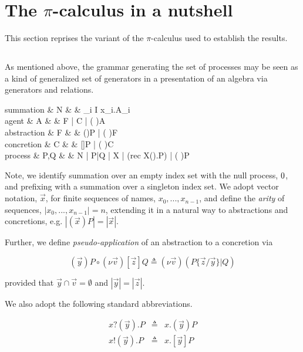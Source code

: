 \documentclass[]{llncs}
\begin{document}
\section{The $\pi$-calculus in a nutshell} \label{Pinut}

This section reprises the variant of the $\pi$-calculus used to
establish the results.

\subsection{\pic}

As mentioned above, the grammar generating the set of processes may be
seen as a kind of generalized set of generators in a presentation of
an algebra via generators and relations.

\begin{grammar}
\mbox{summation} & {N} & \bc & \Sigma_{i \in I} x_i.A_i \\
\mbox{agent} & {A} & \bc & F \;| \; C \;| \; (\nu \; )A \\
\mbox{abstraction} & {F} & \bc & ()P \;| \; (\nu \; )F \\
\mbox{concretion} & {C} & \bc & []P \;| \; (\nu \; )C \\
\mbox{process} & {P,Q} & \bc & N \;| \;P|Q \;| X\langle {} \rangle \;| \; (\textsf{rec} \; X().P)\langle {} \rangle \;| \; (\nu \; )P
\end{grammar} 

Note, we identify summation over an empty index set with the null
process, $\mathbin{0}$, and prefixing with a summation over a singleton
index set. We adopt vector notation, $\vec{x}$, for finite sequences
of names, $x_0,...,x_{n-1}$, and define the \emph{arity} of sequences,
$|x_0,...,x_{n-1}| = n$, extending it in a natural way to abstractions
and concretions, e.g. $|(\vec{x})P| = |\vec{x}|$.

Further, we define \emph{pseudo-application} of an abstraction to a concretion via

\begin{equation}
  (\vec{y})P \circ (\nu \vec{v})[\vec{z}]Q \triangleq (\nu \vec{v})(P\{\vec{z}/\vec{y}\} | Q)
\end{equation}

provided that $\vec{y} \cap \vec{v} = \emptyset$ and $|\vec{y}| = |\vec{z}|$.

We also adopt the following standard abbreviations.

\begin{eqnarray}
  x?(\vec{y}).P & \triangleq & x.(\vec{y})P \\
  x!(\vec{y}).P & \triangleq & x.[\vec{y}]P
\end{eqnarray}
\end{document}
